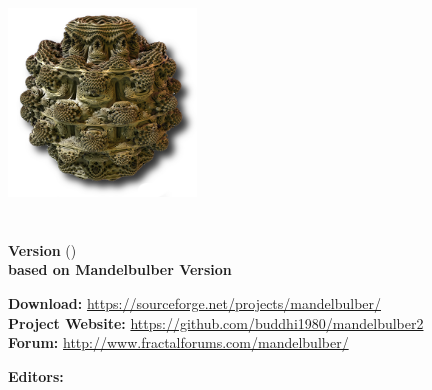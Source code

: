 \begin{titlepage}
	\begin{center}
		\vspace{1.5cm}
			\includegraphics[width=5cm]{img/mandelbulber_logo.png} \\
		\vspace{0.5cm}
		\Huge\textbf{\mTitle}\\
		\Huge\mSubtitle\\
		\vspace{1.5cm}
		\large\textbf{Version \mVersionDocument} (\mDateDocument)\\
		\large\textbf{based on Mandelbulber Version \mVersionMandelbulber}\\
	\end{center}
	\normalsize
	\vspace{2cm}
	\begin{flushright}
		\begin{doublespacing}
			\textbf{Download:} \url{https://sourceforge.net/projects/mandelbulber/}\\
			\textbf{Project Website:} \url{https://github.com/buddhi1980/mandelbulber2}\\
			\textbf{Forum:} \url{http://www.fractalforums.com/mandelbulber/}\\
		\end{doublespacing}
	\end{flushright}
	\vspace{2cm}
	\textbf{Editors:}\\
	\mAuthor\\
	\vfill
\end{titlepage}

\setcounter{page}{1}
\tableofcontents
\newpage


\setcounter{page}{1}





